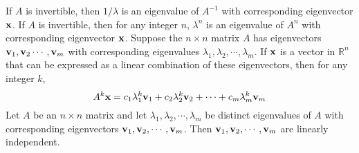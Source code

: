 \documentclass{article}
\begin{document}
\begin{outline}
            \2 If $A$ is invertible, then \(1/\lambda\) is an eigenvalue of \(A^{-1}\) with corresponding eigenvector \(\vb x\). 
            \2 If \(A\) is invertible, then for any integer \(n\), \(\lambda^n\) is an eigenvalue of \(A^n\) with corresponding eigenvector \(\vb x\). 
        \1 Suppose the \(n\times n\) matrix $A$ has eigenvectors \(\vb v_1,\vb v_2\cdots,\vb v_m\) with corresponding eigenvalues \(\lambda_1,\lambda_2,\cdots,\lambda_m\). If \(\vb x\) is a vector in \(\mathbb R^n\) that can be expressed as a linear combination of these eigenvectors, then for any integer $k$, \[A^k\vb x=c_1\lambda_1^k\vb v_1+c_2\lambda_2^k\vb v_2+\cdots+c_m\lambda_m^k\vb v_m\]
        \1 Let $A$ be an \(n\times n\) matrix and let \(\lambda_1,\lambda_2,\cdots,\lambda_m\) be distinct eigenvalues of $A$ with corresponding eigenvectors \(\vb v_1,\vb v_2,\cdots,\vb v_m\). Then \(\vb v_1,\vb v_2,\cdots,\vb v_m\) are linearly independent. 

    \end{outline}
    
\end{document}
